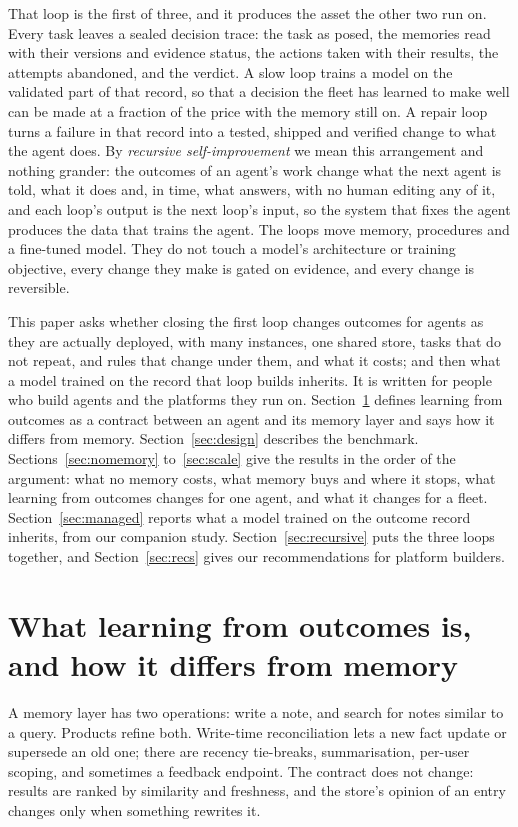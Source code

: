 \documentclass[11pt]{article}
\begin{document}
That loop is the first of three, and it produces the asset the other two run on. Every task
leaves a sealed decision trace: the task as posed, the memories read with their versions and
evidence status, the actions taken with their results, the attempts abandoned, and the
verdict. A slow loop trains a model on the validated part of that record, so that a decision
the fleet has learned to make well can be made at a fraction of the price with the memory
still on. A repair loop turns a failure in that record into a tested, shipped and verified
change to what the agent does. By \emph{recursive self-improvement} we mean this arrangement
and nothing grander: the outcomes of an agent's work change what the next agent is told, what
it does and, in time, what answers, with no human editing any of it, and each loop's output is
the next loop's input, so the system that fixes the agent produces the data that trains the
agent. The loops move memory, procedures and a fine-tuned model. They do not touch a model's
architecture or training objective, every change they make is gated on evidence, and every
change is reversible.

This paper asks whether closing the first loop changes outcomes for agents as they are
actually deployed, with many instances, one shared store, tasks that do not repeat, and rules
that change under them, and what it costs; and then what a model trained on the record that
loop builds inherits. It is written for people who build agents and the platforms they run
on. Section~\ref{sec:cl} defines learning from outcomes as a contract between an agent and its
memory layer and says how it differs from memory. Section~\ref{sec:design} describes the
benchmark. Sections~\ref{sec:nomemory} to~\ref{sec:scale} give the results in the order of the
argument: what no memory costs, what memory buys and where it stops, what learning from
outcomes changes for one agent, and what it changes for a fleet. Section~\ref{sec:managed}
reports what a model trained on the outcome record inherits, from our companion study.
Section~\ref{sec:recursive} puts the three loops together, and Section~\ref{sec:recs} gives
our recommendations for platform builders.

\section{What learning from outcomes is, and how it differs from memory}
\label{sec:cl}

A memory layer has two operations: write a note, and search for notes similar to a query.
Products refine both. Write-time reconciliation lets a new fact update or supersede an old one;
there are recency tie-breaks, summarisation, per-user scoping, and sometimes a feedback
endpoint. The contract does not change: results are ranked by similarity and freshness, and
the store's opinion of an entry changes only when something rewrites it.
\end{document}
